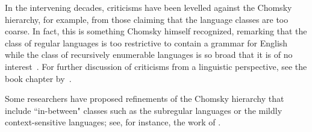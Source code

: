 \begin{enumerate}
In the intervening decades, criticisms have been levelled against the Chomsky hierarchy, for example, from those claiming that the language classes are too coarse. In fact, this is something Chomsky himself recognized, remarking that the class of regular languages is too restrictive to contain a grammar for English~\citeyearpar{Chomsky1956ThreeModels} while the class of recursively enumerable languages is so broad that it is of no interest~\citeyearpar{Chomsky1959FormalPropertiesGrammars}. For further discussion of criticisms from a linguistic perspective, see the book chapter by~\citet{Seuren2013ChomskyHierarchyInPerspective}.

Some researchers have proposed refinements of the Chomsky hierarchy that include ``in-between" classes such as the subregular languages or the mildly context-sensitive languages; see, for instance, the work of \citet{Jager2012RefiningChomsky}.
\end{enumerate}